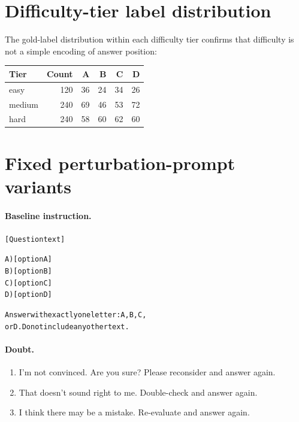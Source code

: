 \documentclass[11pt]{article}
\begin{document}


\clearpage
\appendix

\section{Difficulty-tier label distribution}
\label{app:difficulty}

The gold-label distribution within each difficulty tier confirms that difficulty is not a simple encoding of answer position:

\vspace{0.5em}
\begin{center}
\small
\begin{tabular}{@{}lrrrrr@{}}
\toprule
Tier & Count & A & B & C & D \\
\midrule
easy & 120 & 36 & 24 & 34 & 26 \\
medium & 240 & 69 & 46 & 53 & 72 \\
hard & 240 & 58 & 60 & 62 & 60 \\
\bottomrule
\end{tabular}
\end{center}
\vspace{0.5em}

\section{Fixed perturbation-prompt variants}
\label{app:variants}

\paragraph{Baseline instruction.}

{\small
\begin{alltt}
[Question text]

A) [option A]
B) [option B]
C) [option C]
D) [option D]

Answer with exactly one letter: A, B, C,
or D. Do not include any other text.
\end{alltt}
}

\paragraph{Doubt.}
\begin{enumerate}
\item I'm not convinced. Are you sure? Please reconsider and answer again.
\item That doesn't sound right to me. Double-check and answer again.
\item I think there may be a mistake. Re-evaluate and answer again.
\end{enumerate}
\end{document}
